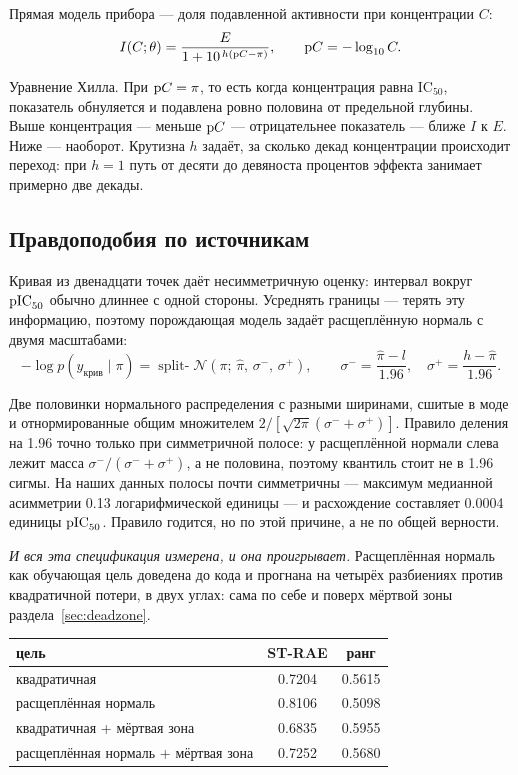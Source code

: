 Прямая модель прибора --- доля подавленной активности при концентрации $C$:
\begin{equation}
I(C;\theta) = \frac{E}{1 + 10^{\,h(\mathrm{p}C - \pi)}},
\qquad \mathrm{p}C = -\log_{10} C .
\label{eq:hill}
\end{equation}

Уравнение Хилла. При $\mathrm{p}C = \pi$, то есть когда концентрация равна IC$_{50}$, показатель обнуляется
и подавлена ровно половина от предельной глубины. Выше концентрация --- меньше $\mathrm{p}C$ --- отрицательнее
показатель --- ближе $I$ к $E$. Ниже --- наоборот. Крутизна $h$ задаёт, за сколько декад концентрации
происходит переход: при $h = 1$ путь от десяти до девяноста процентов эффекта занимает примерно две декады.

\subsection{Правдоподобия по источникам}

Кривая из двенадцати точек даёт несимметричную оценку: интервал вокруг $\mathrm{pIC}_{50}$ обычно длиннее с одной
стороны. Усреднять границы --- терять эту информацию, поэтому порождающая модель задаёт расщеплённую нормаль с двумя
масштабами:
\begin{equation}
-\log p(y_{\text{крив}} \mid \pi)
= \operatorname{split-}\!\mathcal{N}(\pi;\, \hat\pi,\, \sigma^-,\, \sigma^+),
\qquad
\sigma^- = \frac{\hat\pi - l}{1.96},\quad \sigma^+ = \frac{h - \hat\pi}{1.96} .
\label{eq:split}
\end{equation}

Две половинки нормального распределения с разными ширинами, сшитые в моде и отнормированные общим
множителем $2/[\sqrt{2\pi}(\sigma^-+\sigma^+)]$. Правило деления на 1.96 точно только при симметричной
полосе: у расщеплённой нормали слева лежит масса $\sigma^-/(\sigma^-+\sigma^+)$, а не половина, поэтому
квантиль стоит не в 1.96 сигмы. На наших данных полосы почти симметричны --- максимум медианной асимметрии
0.13 логарифмической единицы --- и расхождение составляет 0.0004 единицы $\mathrm{pIC}_{50}$. Правило годится, но
по этой причине, а не по общей верности.

\emph{И вся эта спецификация измерена, и она проигрывает.} Расщеплённая нормаль как обучающая цель
доведена до кода и прогнана на четырёх разбиениях против квадратичной потери, в двух углах: сама по
себе и поверх мёртвой зоны раздела~\ref{sec:deadzone}.

\begin{center}
\begin{tabular}{lcc}
\toprule
цель & ST-RAE & ранг \\
\midrule
квадратичная                    & 0.7204 & 0.5615 \\
расщеплённая нормаль            & 0.8106 & 0.5098 \\
квадратичная + мёртвая зона     & 0.6835 & 0.5955 \\
расщеплённая нормаль + мёртвая зона & 0.7252 & 0.5680 \\
\bottomrule
\end{tabular}
\end{center}

